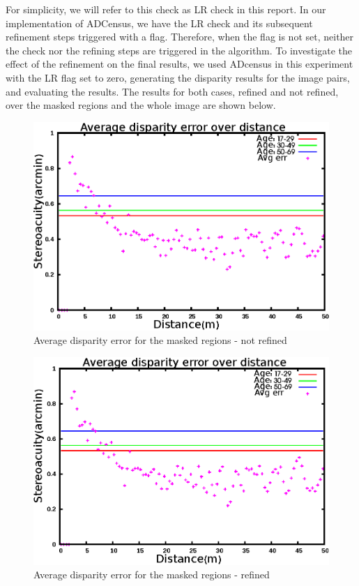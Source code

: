 For simplicity, we will refer
to this check as LR check in this report.
In our implementation of ADCensus, we have the LR check and its subsequent refinement steps triggered with a flag.
Therefore, when the flag is not set, neither the check nor the refining steps are triggered in the algorithm.
To investigate the effect of the refinement on the final results, we used 
ADcensus in this experiment with the LR flag set to zero, generating the disparity results for the image pairs, and evaluating the results.
The results for both cases, refined and not refined, over the masked regions and the whole image are shown below.

\begin{figure}[H]
\centering
\includegraphics[scale=0.8]{adcenmsk3NoLR}
\caption{Average disparity error for the masked regions - not refined}
\label{fig:adcmnoLR}
\end{figure} 

\begin{figure}[H]
\centering
\includegraphics[scale=0.8]{adcenmsk3}
\caption{Average disparity error for the masked regions - refined}
\label{fig:adcm3}
\end{figure} 

